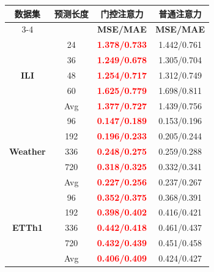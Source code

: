 \begin{table}[H]
\centering
\scriptsize
\setlength{\tabcolsep}{3.2pt}
\renewcommand{\arraystretch}{0.96}
\setlength{\aboverulesep}{0.3ex}
\setlength{\belowrulesep}{0.3ex}
\label{tab:chap3-gated-vs-plain}
\begin{tabular}{c|c|c|c}
\toprule
\multirow{2}{*}{\textbf{数据集}} &
\multirow{2}{*}{\textbf{预测长度}} &
\textbf{门控注意力} &
\textbf{普通注意力} \\
\cmidrule(lr){3-4}
& & \textbf{MSE/MAE} & \textbf{MSE/MAE} \\
\midrule
\multirow{5}{*}{\textbf{ILI}}
& 24 & \textbf{\textcolor{red}{1.378/0.733}} & 1.442/0.761 \\
& 36 & \textbf{\textcolor{red}{1.249/0.678}} & 1.305/0.704 \\
& 48 & \textbf{\textcolor{red}{1.254/0.717}} & 1.312/0.749 \\
& 60 & \textbf{\textcolor{red}{1.625/0.779}} & 1.698/0.811 \\
& Avg & \textbf{\textcolor{red}{1.377/0.727}} & 1.439/0.756 \\
\midrule
\multirow{5}{*}{\textbf{Weather}}
& 96 & \textbf{\textcolor{red}{0.147/0.189}} & 0.153/0.196 \\
& 192 & \textbf{\textcolor{red}{0.196/0.233}} & 0.205/0.244 \\
& 336 & \textbf{\textcolor{red}{0.248/0.275}} & 0.259/0.288 \\
& 720 & \textbf{\textcolor{red}{0.318/0.325}} & 0.332/0.341 \\
& Avg & \textbf{\textcolor{red}{0.227/0.256}} & 0.237/0.267 \\
\midrule
\multirow{5}{*}{\textbf{ETTh1}}
& 96 & \textbf{\textcolor{red}{0.352/0.375}} & 0.368/0.391 \\
& 192 & \textbf{\textcolor{red}{0.398/0.402}} & 0.416/0.421 \\
& 336 & \textbf{\textcolor{red}{0.442/0.418}} & 0.461/0.437 \\
& 720 & \textbf{\textcolor{red}{0.432/0.439}} & 0.451/0.458 \\
& Avg & \textbf{\textcolor{red}{0.406/0.409}} & 0.424/0.427 \\
\bottomrule
\end{tabular}

\end{table}
